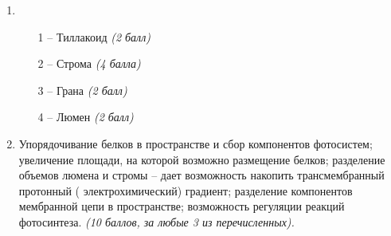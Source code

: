 \solutionSection
\begin{enumerate}
    \item
    \begin{enumerate}
    \item [1 –] Тиллакоид \textit{(2 балл)}
    \item [2 –] Строма \textit{(4 балла)}
    \item [3 –] Грана \textit{(2 балл)}
    \item [4 –] Люмен \textit{(2 балл)}
    \end{enumerate}
    \item Упорядочивание белков в пространстве и сбор компонентов фотосистем; увеличение площади, на которой возможно размещение белков;  разделение объемов люмена и стромы – дает возможность накопить трансмембранный протонный ( электрохимический) градиент; разделение  компонентов мембранной цепи в пространстве;  возможность регуляции реакций фотосинтеза. \textit{(10 баллов, за любые 3 из перечисленных).}
    \end{enumerate}